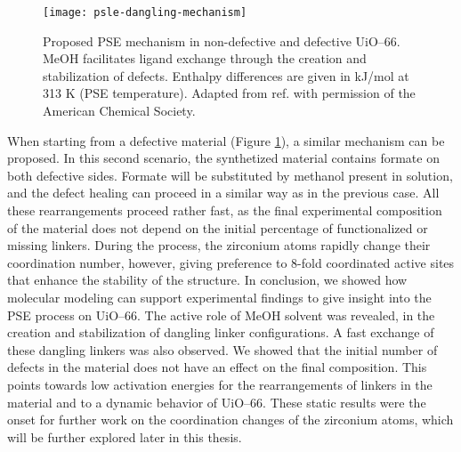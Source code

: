 \begin{figure}[!bthp]
	\centering
	\texttt{[image: psle-dangling-mechanism]}
	\caption{Proposed PSE mechanism in non-defective and defective UiO--66. MeOH facilitates ligand exchange through the creation and stabilization of defects. Enthalpy differences are given in kJ/mol at 313 K (PSE temperature). Adapted from ref. \cite{marreiros2019active} with permission of the American Chemical Society.}
	\label{fig:psle-dangling-mechanism}
\end{figure}
\npar
When starting from a defective material (Figure \ref{fig:psle-dangling-mechanism}), a similar mechanism can be proposed. In this second scenario, the synthetized material contains formate on both defective sides. Formate will be substituted by methanol present in solution, and the defect healing can proceed in a similar way as in the previous case. All these rearrangements proceed rather fast, as the final experimental composition of the material does not depend on the initial percentage of functionalized or missing linkers. During the process, the zirconium atoms rapidly change their coordination number, however, giving preference to 8-fold coordinated active sites that enhance the stability of the structure. 
\npar
In conclusion, we showed how molecular modeling can support experimental findings to give insight into the PSE process on UiO--66. The active role of MeOH solvent was revealed, in the creation and stabilization of dangling linker configurations. A fast exchange of these dangling linkers was also observed. We showed that the initial number of defects in the material does not have an effect on the final composition. This points towards low activation energies for the rearrangements of linkers in the material and to a dynamic behavior of UiO--66. These static results were the onset for further work on the coordination changes of the zirconium atoms, which will be further explored later in this thesis.

